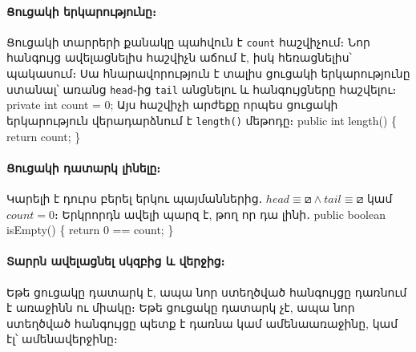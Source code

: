 %
\paragraph{Ցուցակի երկարությունը։}
Ցուցակի տարրերի քանակը պահվուն է \texttt{count} հաշվիչում։
Նոր հանգույց ավելացնելիս հաշվիչն աճում է, իսկ հեռացնելիս՝
պակասում։ Սա հնարավորություն է տալիս ցուցակի երկարությունը
ստանալ՝ առանց \texttt{head}֊ից \texttt{tail} անցնելու և 
հանգույցները հաշվելու։ 
\nwenddocs{}\endmoddef{}
private int count = 0;
\nwendcode{}\nwdocspar
Այս հաշվիչի արժեքը որպես ցուցակի երկարություն վերադարձնում
է \texttt{length()} մեթոդը։
\nwenddocs{}\plusendmoddef
public int length()
\{
  return count;
\}
\nwendcode{}\nwdocspar

%
\paragraph{Ցուցակի դատարկ լինելը։}
Կարելի է դուրս բերել երկու պայմաններից․ 
\(head\equiv\boxslash\wedge tail\equiv\boxslash\) կամ
\(count=0\)։ Երկրորդն ավելի պարզ է, թող որ դա լինի․
\nwenddocs{}\endmoddef{}
public boolean isEmpty()
\{
  return 0 == count;
\}
\nwendcode{}\nwdocspar

%
\paragraph{Տարրն ավելացնել սկզբից և վերջից։}
Եթե ցուցակը դատարկ է, ապա նոր ստեղծված հանգույցը դառնում 
է առաջինն ու միակը։ Եթե ցուցակը դատարկ չէ, ապա նոր ստեղծված
հանգույցը պետք է դառնա կամ ամենաառաջինը, կամ էլ՝ ամենավերջինը։

